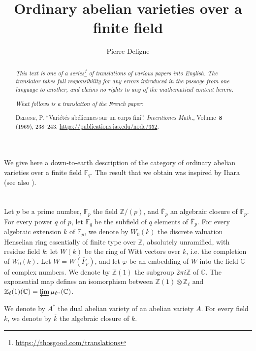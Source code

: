 \documentclass{article}
\title{Ordinary abelian varieties over a finite field}
\author{Pierre Deligne}
\date{}
\newcommand{\FF}{\mathbb{F}}
\newcommand{\ZZ}{\mathbb{Z}}
\newcommand{\CC}{\mathbb{C}}
\newcommand{\oldpage}[1]{\marginpar{\footnotesize$\Big\vert$ \textit{p.~#1}}}
\begin{document}
\maketitle
\thispagestyle{fancy}

\renewcommand{\abstractname}{Translator's note.}

\begin{abstract}
  \renewcommand*{\thefootnote}{\fnsymbol{footnote}}
  \emph{This text is one of a series\footnote{\url{https://thosgood.com/translations}} of translations of various papers into English.}
  \emph{The translator takes full responsibility for any errors introduced in the passage from one language to another, and claims no rights to any of the mathematical content herein.}
  
  \emph{What follows is a translation of the French paper:}

  \medskip\noindent
  \textsc{Deligne, P.}
  ``Vari\'{e}t\'{e}s ab\'{e}liennes sur un corps fini''.
  \emph{Inventiones Math.}, Volume~\textbf{8} (1969), 238--243.
  {\url{https://publications.ias.edu/node/352}}.
\end{abstract}

\setcounter{footnote}{0}



\oldpage{238}
We give here a down-to-earth description of the category of ordinary abelian varieties over a finite field $\FF_q$.
The result that we obtain was inspired by Ihara~\cite[ch.~V]{2} (see also \cite{3}).


\section{}
\label{1}
Let $p$ be a prime number, $\FF_p$ the field $\ZZ/(p)$, and $\overline{\FF}_p$ an algebraic closure of $\FF_p$.
For every power $q$ of $p$, let $\FF_q$ be the subfield of $q$ elements of $\overline{\FF}_p$.
For every algebraic extension $k$ of $\FF_p$, we denote by $W_0(k)$ the discrete valuation Henselian ring essentially of finite type over $\ZZ$, absolutely unramified, with residue field $k$;
let $W(k)$ be the ring of Witt vectors over $k$, i.e. the completion of $W_0(k)$.
Let $W=W(\overline{F}_p)$, and let $\varphi$ be an embedding of $W$ into the field $\CC$ of complex numbers.
We denote by $\ZZ(1)$ the subgroup $2\pi i\ZZ$ of $\CC$.
The exponential map defines an isomorphism between $\ZZ(1)\otimes\ZZ_\ell$ and $\ZZ_\ell(1)(\CC)=\varprojlim\mu_{\ell^n}(\CC)$.

We denote by $A^*$ the dual abelian variety of an abelian variety $A$.
For every field $k$, we denote by $\overline{k}$ the algebraic closure of $k$.
\end{document}
